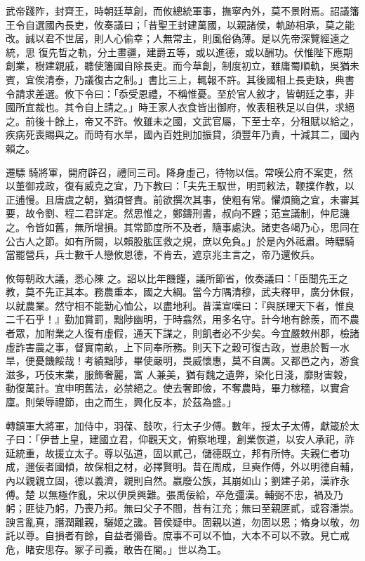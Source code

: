 \begin{pinyinscope}
 武帝踐阼，封齊王，時朝廷草創，而攸總統軍事，撫寧內外，莫不景附焉。詔議籓王令自選國內長吏，攸奏議曰；「昔聖王封建萬國，以親諸侯，軌跡相承，莫之能改。誠以君不世居，則人心偷幸；人無常主，則風俗偽薄。是以先帝深覽經遠之統，思
 復先哲之軌，分土畫疆，建爵五等，或以進德，或以酬功。伏惟陛下應期創業，樹建親戚，聽使籓國自除長吏。而今草創，制度初立，雖庸蜀順軌，吳猶未賓，宜俟清泰，乃議復古之制。」書比三上，輒報不許。其後國相上長吏缺，典書令請求差選。攸下令曰：「忝受恩禮，不稱惟憂。至於官人敘才，皆朝廷之事，非國所宜裁也。其令自上請之。」時王家人衣食皆出御府，攸表租秩足以自供，求絕之。前後十餘上，帝又不許。攸雖未之國，文武官屬，下至士卒，分租賦以給之，疾病死喪賜與之。而時有水旱，國內百姓則加振貸，須豐年乃責，十減其二，國內賴之。



 遷驃
 騎將軍，開府辟召，禮同三司。降身虛己，待物以信。常嘆公府不案吏，然以董御戎政，復有威克之宜，乃下教曰：「夫先王馭世，明罰敕法，鞭撲作教，以正逋慢。且唐虞之朝，猶須督責。前欲撰次其事，使粗有常。懼煩簡之宜，未審其要，故令劉、程二君詳定。然思惟之，鄭鑄刑書，叔向不韙；范宣議制，仲尼譏之。令皆如舊，無所增損。其常節度所不及者，隨事處決。諸吏各竭乃心，思同在公古人之節。如有所闕，以賴股肱匡救之規，庶以免負。」於是內外祗肅。時驃騎當罷營兵，兵士數千人戀攸恩德，不肯去，遮京兆主言之，帝乃還攸兵。



 攸每朝政大議，悉心陳
 之。詔以比年饑饉，議所節省，攸奏議曰：「臣聞先王之教，莫不先正其本。務農重本，國之大綱。當今方隅清穆，武夫釋甲，廣分休假，以就農業。然守相不能勤心恤公，以盡地利。昔漢宣嘆曰：『與朕理天下者，惟良二千石乎！』勤加賞罰，黜陟幽明，于時翕然，用多名守。計今地有餘羨，而不農者眾，加附業之人復有虛假，通天下謀之，則飢者必不少矣。今宜嚴敕州郡，檢諸虛詐害農之事，督實南畝，上下同奉所務。則天下之穀可復古政，豈患於暫一水旱，便憂饑餒哉！考績黜陟，畢使嚴明，畏威懷惠，莫不自厲。又都邑之內，游食滋多，巧伎末業，服飾奢麗，富
 人兼美，猶有魏之遺弊，染化日淺，靡財害穀，動復萬計。宜申明舊法，必禁絕之。使去奢即儉，不奪農時，畢力稼穡，以實倉廩。則榮辱禮節，由之而生，興化反本，於茲為盛。」



 轉鎮軍大將軍，加侍中，羽葆、鼓吹，行太子少傅。數年，授太子太傅，獻箴於太子曰：「伊昔上皇，建國立君，仰觀天文，俯察地理，創業恢道，以安人承祀，祚延統重，故援立太子。尊以弘道，固以貳己，儲德既立，邦有所恃。夫親仁者功成，邇佞者國傾，故保相之材，必擇賢明。昔在周成，旦奭作傅，外以明德自輔，內以親親立固，德以義濟，親則自然。嬴廢公族，其崩如山；劉建子弟，漢祚永傅。楚
 以無極作亂，宋以伊戾興難。張禹佞給，卒危彊漢。輔弼不忠，禍及乃躬；匪徒乃躬，乃喪乃邦。無曰父子不間，昔有江充；無曰至親匪貳，或容潘崇。諛言亂真，譖潤離親，驪姬之讒。晉侯疑申。固親以道，勿固以恩；脩身以敬，勿託以尊。自損者有餘，自益者彌昏。庶事不可以不恤，大本不可以不敦。見亡戒危，睹安思存。冢子司義，敢告在閽。」世以為工。




\end{pinyinscope}
